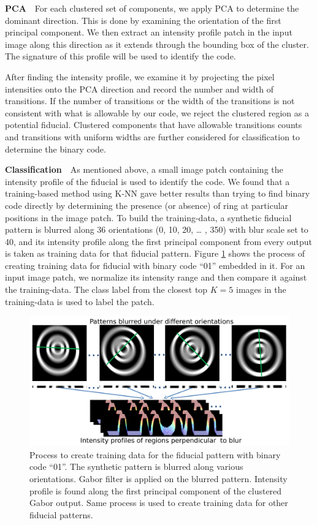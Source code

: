 \documentclass[10pt,twocolumn,letterpaper]{article}
\begin{document}
\noindent\textbf{PCA}~~For each clustered set of components, we apply
PCA to determine the dominant direction.  This is done by examining the
orientation of the first principal component.  We then extract an intensity
profile patch in the input image along this direction as it extends through the
bounding box of the cluster. The signature of this profile will be used to
identify the code.

After finding the intensity profile, we examine it by
projecting the pixel intensities onto the PCA direction and record the
number and width of transitions.  If the number of transitions or the
width of the transitions is not consistent with what is allowable by
our code, we reject the clustered region as a potential fiducial.
Clustered components that have allowable transitions counts and transitions with
uniform widths are further considered for classification to determine
the binary code.

\noindent\textbf{Classification}~~As mentioned above, a small image patch
containing the intensity profile of the fiducial is used to identify the code.   We found
that a training-based method using K-NN gave better results than trying to
find binary code directly by determining the presence (or absence) of ring
at particular positions in the image patch. To build the training-data, a
synthetic fiducial pattern is blurred along 36 orientations (0, 10, 20, \ldots
, 350) with blur scale set to 40, and its intensity profile along the first
principal component from every output is taken as training data for that
fiducial pattern. Figure \ref{fig:training_data} shows the process of creating
training data for fiducial with binary code ``01'' embedded in it.  For an
input image patch, we normalize its intensity range and then compare it against
the training-data. The class label from the closest top $K=5$ images in the
training-data is used to label the patch.

\begin{figure}[h!]
\centering
  \includegraphics[width=0.8\linewidth]{training_data.pdf}
  \caption{Process to create training data for the fiducial pattern with binary
  code ``01''. The synthetic pattern is blurred along various orientations. Gabor
  filter is applied on the blurred pattern. Intensity profile is found along the
  first principal component of the clustered Gabor output. Same process is used
  to create training data for other fiducial patterns.}
  \label{fig:training_data}
\end{figure}
\end{document}
